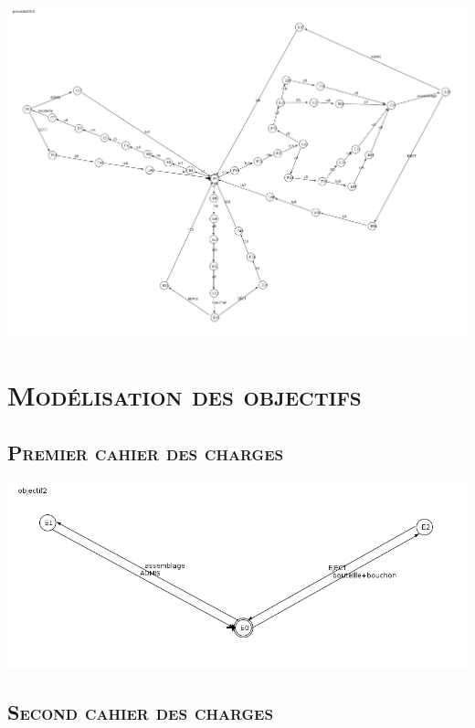 		 	\begin{center}
			\includegraphics[scale=0.25]{procede.png}
			\label{fig3}
			\end{center} 
	
	 \pagebreak
		 \section{\textsc{Modélisation des objectifs}} 
		 \subsection{\textsc{Premier cahier des charges}} 
		 
		 	\begin{center}
			\includegraphics[scale=0.4]{obj1.png}
			\label{fig4}
			\end{center} 
		
		 \subsection{\textsc{Second cahier des charges}} 
		 
